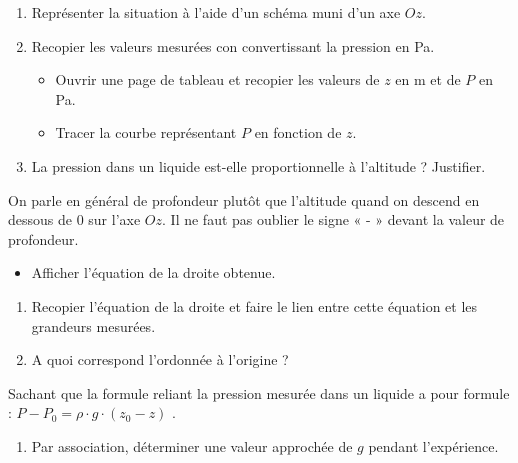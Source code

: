 \documentclass[a4paper,11pt,fleqn]{article}%
\begin{document}
\begin{enumerate}
	\item Représenter la situation à l’aide d’un schéma muni d’un axe $Oz$.
	\item Recopier les valeurs mesurées con convertissant la pression en Pa.
	\begin{itemize}
		\item Ouvrir une page de tableau et recopier les valeurs de $z$ en \unit{\meter} et de $P$ en \unit{\pascal}.
		\item Tracer la courbe représentant $P$ en fonction de $z$.
	\end{itemize}
	\item La pression dans un liquide est-elle proportionnelle à l’altitude ? Justifier.
\end{enumerate}
On parle en général de profondeur plutôt que l’altitude quand on descend en dessous de $0$ sur l’axe $Oz$. Il ne
faut pas oublier le signe « - » devant la valeur de profondeur.
\begin{itemize}
	\item Afficher l’équation de la droite obtenue.
\end{itemize}
\begin{enumerate}[resume]
	\item Recopier l’équation de la droite et faire le lien entre cette équation et les grandeurs mesurées.
	\item A quoi correspond l’ordonnée à l’origine ?
\end{enumerate}
Sachant que la formule reliant la pression mesurée dans un liquide a pour formule : $P-P_0 =\rho\cdot g\cdot ( z_0-z )$ .

\begin{enumerate}[resume]
	\item Par association, déterminer une valeur approchée de $g$ pendant l’expérience.
\end{enumerate}
\end{document}
